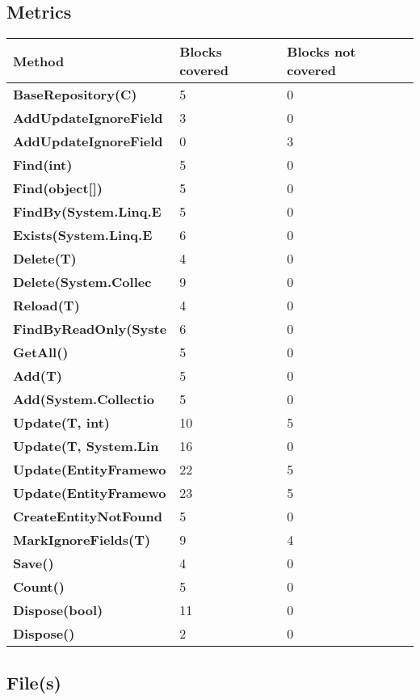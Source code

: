 \documentclass[a4paper,10pt]{article}
\begin{document}
\subsection{Metrics}
\begin{longtable}[l]{|l|l|l|}
\hline
\textbf{Method} & \textbf{Blocks covered} & \textbf{Blocks not covered}\\
\hline
\textbf{BaseRepository(C)} & 5 & 0\\
\hline
\textbf{AddUpdateIgnoreField} & 3 & 0\\
\hline
\textbf{AddUpdateIgnoreField} & 0 & 3\\
\hline
\textbf{Find(int)} & 5 & 0\\
\hline
\textbf{Find(object[])} & 5 & 0\\
\hline
\textbf{FindBy(System.Linq.E} & 5 & 0\\
\hline
\textbf{Exists(System.Linq.E} & 6 & 0\\
\hline
\textbf{Delete(T)} & 4 & 0\\
\hline
\textbf{Delete(System.Collec} & 9 & 0\\
\hline
\textbf{Reload(T)} & 4 & 0\\
\hline
\textbf{FindByReadOnly(Syste} & 6 & 0\\
\hline
\textbf{GetAll()} & 5 & 0\\
\hline
\textbf{Add(T)} & 5 & 0\\
\hline
\textbf{Add(System.Collectio} & 5 & 0\\
\hline
\textbf{Update(T, int)} & 10 & 5\\
\hline
\textbf{Update(T, System.Lin} & 16 & 0\\
\hline
\textbf{Update(EntityFramewo} & 22 & 5\\
\hline
\textbf{Update(EntityFramewo} & 23 & 5\\
\hline
\textbf{CreateEntityNotFound} & 5 & 0\\
\hline
\textbf{MarkIgnoreFields(T)} & 9 & 4\\
\hline
\textbf{Save()} & 4 & 0\\
\hline
\textbf{Count()} & 5 & 0\\
\hline
\textbf{Dispose(bool)} & 11 & 0\\
\hline
\textbf{Dispose()} & 2 & 0\\
\hline
\end{longtable}
\subsection{File(s)}
\end{document}
